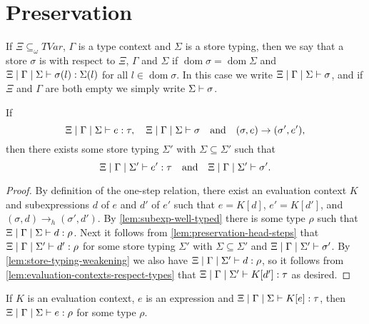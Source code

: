 \documentclass[a4paper, 11pt, article, danish, oneside]{memoir}
\newcommand{\step}{\to}
\newcommand{\headstep}{\to_h}
\newcommand{\dom}{\operatorname{dom}}
\newcommand{\setTVar}{\mathit{TVar}}
\begin{document}
\section{Preservation}

If $\Xi \subseteq_\omega \setTVar$, $\Gamma$ is a type context and $\Sigma$ is a store typing, then we say that a store $\sigma$ is  with respect to $\Xi$, $\Gamma$ and $\Sigma$ if $\dom \sigma = \dom \Sigma$ and $\hastype{\Xi}{\Gamma}{\Sigma}{\sigma(l)}{\Sigma(l)}$ for all $l \in \dom \sigma$. In this case we write $\stotype{\Xi}{\Gamma}{\Sigma}{\sigma}$, and if $\Xi$ and $\Gamma$ are both empty we simply write $\stotype{}{}{\Sigma}{\sigma}$.

\begin{theorem}[Preservation]
    If
    \begin{equation*}
        \hastype{\Xi}{\Gamma}{\Sigma}{e}{\tau},
        \quad
        \stotype{\Xi}{\Gamma}{\Sigma}{\sigma}
        \quad \text{and} \quad
        (\sigma,e) \step (\sigma',e'),
    \end{equation*}
    then there exists some store typing $\Sigma'$ with $\Sigma \subseteq \Sigma'$ such that
    \begin{equation*}
        \hastype{\Xi}{\Gamma}{\Sigma'}{e'}{\tau}
        \quad \text{and} \quad
        \stotype{\Xi}{\Gamma}{\Sigma'}{\sigma'}.
    \end{equation*}
\end{theorem}

\begin{proof}
    By definition of the one-step relation, there exist an evaluation context $K$ and subexpressions $d$ of $e$ and $d'$ of $e'$ such that $e = K[d]$, $e' = K[d']$, and $(\sigma,d) \headstep (\sigma',d')$. By \cref{lem:subexp-well-typed} there is some type $\rho$ such that $\hastype{\Xi}{\Gamma}{\Sigma}{d}{\rho}$. Next it follows from \cref{lem:preservation-head-steps} that $\hastype{\Xi}{\Gamma}{\Sigma'}{d'}{\rho}$ for some store typing $\Sigma'$ with $\Sigma \subseteq \Sigma'$ and $\stotype{\Xi}{\Gamma}{\Sigma'}{\sigma'}$. By \cref{lem:store-typing-weakening} we also have $\hastype{\Xi}{\Gamma}{\Sigma'}{d}{\rho}$, so it follows from \cref{lem:evaluation-contexts-respect-types} that $\hastype{\Xi}{\Gamma}{\Sigma'}{K[d']}{\tau}$ as desired.
\end{proof}


\begin{lemma}
    \label{lem:subexp-well-typed}
    If $K$ is an evaluation context, $e$ is an expression and $\hastype{\Xi}{\Gamma}{\Sigma}{K[e]}{\tau}$, then $\hastype{\Xi}{\Gamma}{\Sigma}{e}{\rho}$ for some type $\rho$.
\end{lemma}
\end{document}
